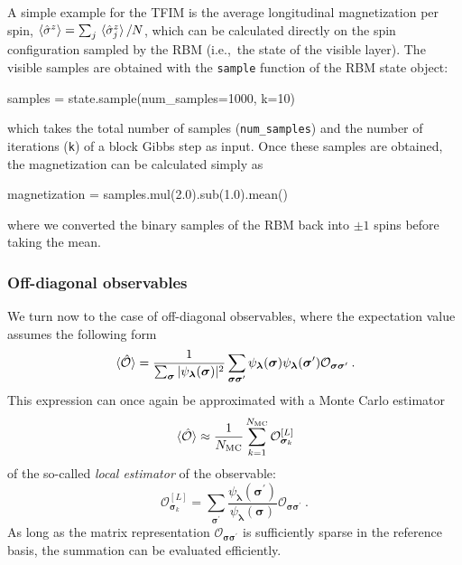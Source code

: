 \documentclass[submission, Phys, hidelnks]{SciPost}
\begin{document}
A simple example for the TFIM is the average longitudinal magnetization per
spin, $\ev{\hat\sigma^z} = \sum_j\ev*{\hat{\sigma}^z_j}/N$,
which can be calculated directly on the spin configuration sampled by the RBM
(i.e.,~the state of the visible layer). The visible samples are obtained with
the \verb|sample| function of the RBM state object:
\begin{python}
samples = state.sample(num_samples=1000, k=10)
\end{python}
which takes the total number of samples (\verb|num_samples|) and the number
of iterations (\verb|k|) of a block Gibbs step as input. Once these samples are obtained,
the magnetization can be calculated simply as
\begin{python}
magnetization = samples.mul(2.0).sub(1.0).mean()
\end{python}
where we converted the binary samples of the RBM back into $\pm 1$ spins before
taking the mean.


\subsubsection{Off-diagonal observables}

We turn now to the case of off-diagonal observables, where the expectation
value assumes the following form
\begin{equation}
    \ev*{\hat{\mathcal{O}}} = \frac{1}{\sum_{\bm{\sigma}} |\psi_{\bm{\lambda}}(\bm{\sigma})|^2}
    \sum_{\bm{\sigma\sigma}^\prime} \psi_{\bm{\lambda}}(\bm{\sigma})
    \psi_{\bm{\lambda}}(\bm{\sigma}^\prime)\mathcal{O}_{\bm{\sigma\sigma}^\prime}\:.
\end{equation}
This expression can once again be approximated with a Monte Carlo estimator
\begin{equation}
    \ev*{\hat{\mathcal{O}}} \approx \frac{1}{N_{\rm MC}} \sum_{k=1}^{N_{\rm MC}} \mathcal{O}^{[L]}_{\bm{\sigma}_k}
\end{equation}
of the so-called \emph{local estimator} of the observable:
\begin{equation}
    \mathcal{O}^{[L]}_{\bm{\sigma}_k}=\sum_{\bm{\sigma}^\prime}\frac{\psi_{\bm{\lambda}}(\bm{\sigma}^\prime)}{\psi_{\bm{\lambda}}(\bm{\sigma})} \mathcal{O}_{\bm{\sigma\sigma}^\prime}\:.
\end{equation}
As long as the matrix representation $\mathcal{O}_{\bm{\sigma\sigma}^\prime}$
is sufficiently sparse in the reference basis, the summation can be evaluated
efficiently.
\end{document}
